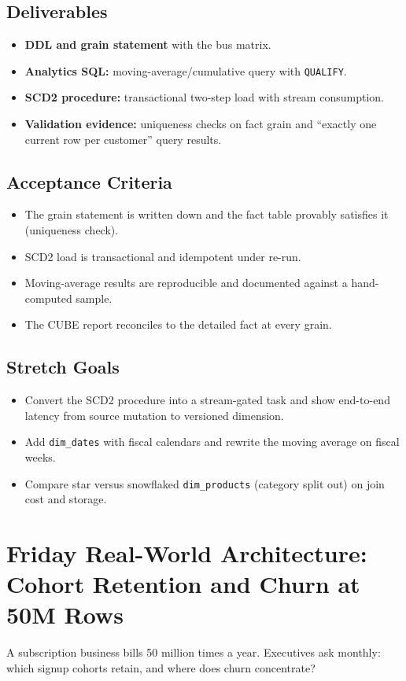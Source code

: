 \subsection*{Deliverables}
\begin{itemize}
    \item \textbf{DDL and grain statement} with the bus matrix.
    \item \textbf{Analytics SQL:} moving-average/cumulative query with \texttt{QUALIFY}.
    \item \textbf{SCD2 procedure:} transactional two-step load with stream consumption.
    \item \textbf{Validation evidence:} uniqueness checks on fact grain and ``exactly one current row per customer'' query results.
\end{itemize}

\subsection*{Acceptance Criteria}
\begin{itemize}
    \item The grain statement is written down and the fact table provably satisfies it (uniqueness check).
    \item SCD2 load is transactional and idempotent under re-run.
    \item Moving-average results are reproducible and documented against a hand-computed sample.
    \item The CUBE report reconciles to the detailed fact at every grain.
\end{itemize}

\subsection*{Stretch Goals}
\begin{itemize}
    \item Convert the SCD2 procedure into a stream-gated task and show end-to-end latency from source mutation to versioned dimension.
    \item Add \texttt{dim\_dates} with fiscal calendars and rewrite the moving average on fiscal weeks.
    \item Compare star versus snowflaked \texttt{dim\_products} (category split out) on join cost and storage.
\end{itemize}

\section{Friday Real-World Architecture: Cohort Retention and Churn at 50M Rows}
A subscription business bills 50 million times a year. Executives ask monthly: which signup cohorts retain, and where does churn concentrate?

